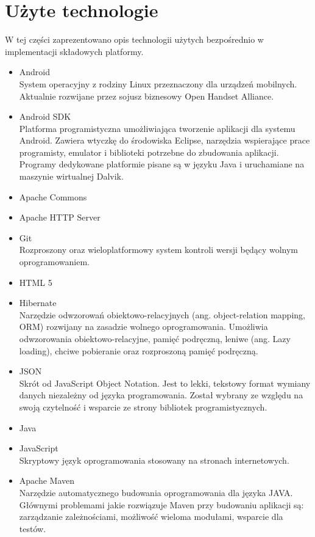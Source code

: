 \documentclass[11pt,a4paper,polish,thesis]{dcsbook}
\begin{document}
\section{Użyte technologie}
W tej części zaprezentowano opis technologii użytych bezpośrednio w implementacji składowych platformy.
\begin{itemize}
\item{Android} \\
System operacyjny z rodziny Linux przeznaczony dla urządzeń mobilnych. Aktualnie rozwijane przez sojusz biznesowy Open Handset Alliance.
\item{Android SDK} \\
Platforma programistyczna umożliwiająca tworzenie aplikacji dla systemu Android. Zawiera wtyczkę do środowiska Eclipse, narzędzia wspierające prace programisty, emulator i biblioteki potrzebne do zbudowania aplikacji. Programy dedykowane platformie pisane są w języku Java i uruchamiane na maszynie wirtualnej Dalvik.
\item{Apache Commons} \\
\item{Apache HTTP Server} \\
\item{Git} \\
Rozproszony oraz wieloplatformowy system kontroli wersji będący wolnym oprogramowaniem. 
\item{HTML 5} \\
\item{Hibernate} \\
Narzędzie odwzorowań obiektowo-relacyjnych (ang. object-relation mapping, ORM) rozwijany na zasadzie wolnego oprogramowania. Umożliwia odwzorowania obiektowo-relacyjne, pamięć podręczną, leniwe (ang. Lazy loading), chciwe pobieranie oraz rozproszoną pamięć podręczną.
\item{JSON} \\
Skrót od JavaScript Object Notation. Jest to lekki, tekstowy format wymiany danych niezależny od języka programowania. Został wybrany ze względu na swoją czytelność i wsparcie ze strony bibliotek programistycznych.
\item{Java} \\
\item{JavaScript} \\
Skryptowy język oprogramowania stosowany na stronach internetowych.
\item{Apache Maven} \\
Narzędzie automatycznego budowania oprogramowania dla języka JAVA. Głównymi problemami jakie rozwiązuje Maven przy budowaniu aplikacji są: zarządzanie zależnościami, możliwość wieloma modułami, wsparcie dla testów.

\end{itemize}
\end{document}
